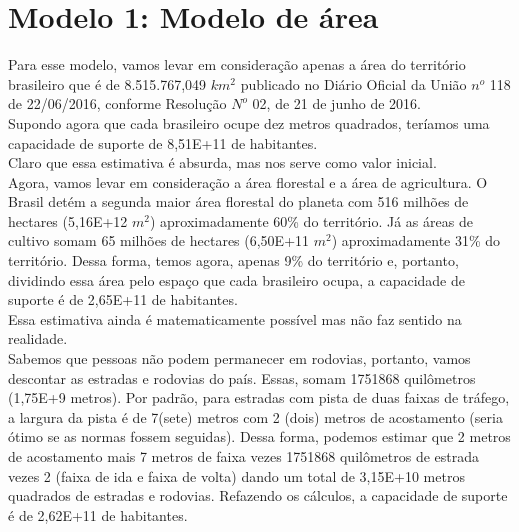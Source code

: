 \documentclass[a4paper]{article}
\begin{document}
\section{Modelo 1: Modelo de \'{a}rea}
Para esse modelo, vamos levar em considera\c{c}\~{a}o apenas a \'{a}rea do territ\'{o}rio brasileiro que \'{e} de  8.515.767,049 $km^2$ publicado no Di\'{a}rio Oficial da Uni\~{a}o $n^o$ 118 de 22/06/2016, conforme Resolu\c{c}\~{a}o $N^o$ 02, de 21 de junho de 2016.
\\
Supondo agora que cada brasileiro ocupe dez metros quadrados, ter\'{i}amos uma capacidade de suporte de 8,51E+11 de habitantes.
\\
Claro que essa estimativa \'{e} absurda, mas nos serve como valor inicial.
\\
Agora, vamos levar em considera\c{c}\~{a}o a \'area florestal e a \'{a}rea de agricultura. O Brasil det\'{e}m a segunda maior \'{a}rea florestal do planeta com 516 milh\~{o}es de hectares (5,16E+12 $m^2$) aproximadamente 60\% do territ\'{o}rio. J\'{a} as \'{a}reas de cultivo somam 65 milh\~{o}es de hectares (6,50E+11 $m^2$) aproximadamente 31\% do territ\'{o}rio. Dessa forma, temos agora, apenas 9\% do territ\'{o}rio e, portanto, dividindo essa \'{a}rea pelo espa\c{c}o que cada brasileiro ocupa, a capacidade de suporte \'{e} de 2,65E+11 de habitantes.
\\
Essa estimativa ainda \'{e} matematicamente poss\'{i}vel mas n\~{a}o faz sentido na realidade.
\\
Sabemos que pessoas n\~{a}o podem permanecer em rodovias, portanto, vamos descontar as estradas e rodovias do pa\'{i}s. Essas, somam 1751868 quil\^{o}metros (1,75E+9 metros). Por padr\~{a}o, para estradas com pista de duas faixas de tr\'{a}fego, a largura da pista \'{e} de 7(sete) metros com 2 (dois) metros de acostamento (seria \'{o}timo se as normas fossem seguidas). Dessa forma, podemos estimar que 2 metros de acostamento mais 7 metros de faixa vezes 1751868 quil\^{o}metros de estrada vezes 2 (faixa de ida e faixa de volta) dando um total de 3,15E+10 metros quadrados de estradas e rodovias. Refazendo os c\'{a}lculos, a capacidade de suporte \'{e} de 2,62E+11 de habitantes. 
\\
\end{document}
